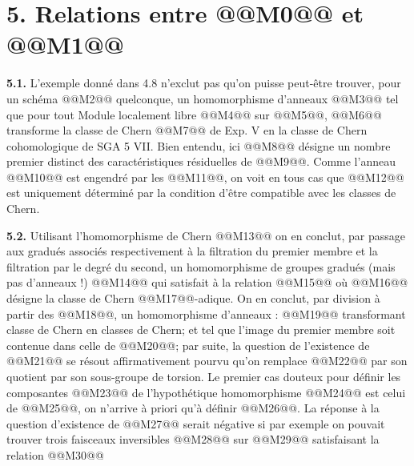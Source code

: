 
\section*{5. Relations entre @@M0@@ et @@M1@@}

\textbf{5.1.} L'exemple donné dans 4.8 n'exclut pas qu'on puisse peut-être trouver, pour un schéma @@M2@@ quelconque, un homomorphisme d'anneaux
@@M3@@
tel que pour tout Module localement libre @@M4@@ sur @@M5@@, @@M6@@ transforme la classe de Chern @@M7@@ de Exp. V en la classe de Chern cohomologique de SGA 5 VII. Bien entendu, ici @@M8@@ désigne un nombre premier distinct des caractéristiques résiduelles de @@M9@@. Comme l'anneau @@M10@@ est engendré par les @@M11@@, on voit en tous cas que @@M12@@ est uniquement déterminé par la condition d'être compatible avec les classes de Chern.

\textbf{5.2.} Utilisant l'homomorphisme de Chern
@@M13@@
on en conclut, par passage aux gradués associés respectivement à la filtration du premier membre et la filtration par le degré du second, un homomorphisme de groupes gradués (mais pas d'anneaux !)
@@M14@@
qui satisfait à la relation
@@M15@@
où @@M16@@ désigne la classe de Chern @@M17@@-adique. On en conclut, par division à partir des @@M18@@, un homomorphisme d'anneaux :
@@M19@@
transformant classe de Chern en classes de Chern; et tel que l'image du premier membre soit contenue dans celle de @@M20@@; par suite, la question de l'existence de @@M21@@ se résout affirmativement pourvu qu'on remplace @@M22@@ par son quotient par son sous-groupe de torsion. Le premier cas douteux pour définir les composantes @@M23@@ de l'hypothétique homomorphisme @@M24@@ est celui de @@M25@@, on n'arrive à priori qu'à définir @@M26@@. La réponse à la question d'existence de @@M27@@ serait négative si par exemple on pouvait trouver trois faisceaux inversibles @@M28@@ sur @@M29@@ satisfaisant la relation
@@M30@@
